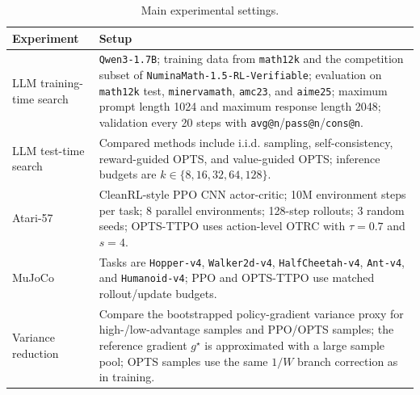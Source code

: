 \begin{table}[t]
\centering
\small
\begin{tabular}{p{}p{}}
\hline
Experiment & Setup \\
\hline
LLM training-time search &
\texttt{Qwen3-1.7B}; training data from \texttt{math12k} and the competition subset of \texttt{NuminaMath-1.5-RL-Verifiable}; evaluation on \texttt{math12k} test, \texttt{minervamath}, \texttt{amc23}, and \texttt{aime25}; maximum prompt length 1024 and maximum response length 2048; validation every 20 steps with \texttt{avg@n}/\texttt{pass@n}/\texttt{cons@n}. \\
LLM test-time search &
Compared methods include i.i.d. sampling, self-consistency, reward-guided OPTS, and value-guided OPTS; inference budgets are $k\in\{8,16,32,64,128\}$. \\
Atari-57 &
CleanRL-style PPO CNN actor-critic; 10M environment steps per task; 8 parallel environments; 128-step rollouts; 3 random seeds; OPTS-TTPO uses action-level OTRC with $\tau=0.7$ and $s=4$. \\
MuJoCo &
Tasks are \texttt{Hopper-v4}, \texttt{Walker2d-v4}, \texttt{HalfCheetah-v4}, \texttt{Ant-v4}, and \texttt{Humanoid-v4}; PPO and OPTS-TTPO use matched rollout/update budgets. \\
Variance reduction &
Compare the bootstrapped policy-gradient variance proxy for high-/low-advantage samples and PPO/OPTS samples; the reference gradient $g^\star$ is approximated with a large sample pool; OPTS samples use the same $1/W$ branch correction as in training. \\
\hline
\end{tabular}
\caption{Main experimental settings.}
\label{tab:experiment-setup}
\end{table}
